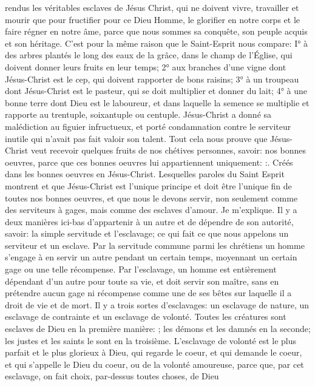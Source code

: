 rendus les véritables esclaves de Jésus Christ, qui ne doivent vivre, travailler et mourir que pour fructifier pour ce
Dieu Homme, le glorifier en notre corps et le faire régner en notre âme, parce que nous sommes sa conquête, son
peuple acquis et son héritage. C'est pour la même raison que le Saint-Esprit nous compare: I° à des arbres plantés
le long des eaux de la grâce, dans le champ de l'Église, qui doivent donner leurs fruits en leur temps; 2° aux
branches d'une vigne dont Jésus-Christ est le cep, qui doivent rapporter de bons raisins; 3° à un troupeau dont
Jésus-Christ est le pasteur, qui se doit multiplier et donner du lait; 4° à une bonne terre dont Dieu est le laboureur,
et dans laquelle la semence se multiplie et rapporte au trentuple, soixantuple ou centuple. Jésus-Christ a donné sa
malédiction au figuier infructueux, et porté condamnation contre le serviteur inutile qui n'avait pas fait valoir son
talent. Tout cela nous prouve que Jésus-Christ veut recevoir quelques fruits de nos chétives personnes, savoir:
nos bonnes oeuvres, parce que ces bonnes oeuvres lui appartiennent uniquement: :. Créés dans les bonnes oeuvres en Jésus-Christ. Lesquelles paroles du Saint Esprit montrent et que
Jésus-Christ est l'unique principe et doit être l'unique fin de toutes nos bonnes oeuvres, et que nous le devons
servir, non seulement comme des serviteurs à gages, mais comme des esclaves d'amour. Je m'explique.
 Il y a deux manières ici-bas d'appartenir à un autre et de dépendre de son autorité, savoir: la simple servitude
et l'esclavage; ce qui fait ce que nous appelons un serviteur et un esclave.
Par la servitude commune parmi les chrétiens un homme s'engage à en servir un autre pendant un certain temps,
moyennant un certain gage ou une telle récompense.
Par l'esclavage, un homme est entièrement dépendant d'un autre pour toute sa vie, et doit servir son maître, sans
en prétendre aucun gage ni récompense comme une de ses bêtes sur laquelle il a droit de vie et de mort.
 Il y a trois sortes d'esclavages: un esclavage de nature, un esclavage de contrainte et un esclavage de
volonté. Toutes les créatures sont esclaves de Dieu en la première manière: ; les
démons et les damnés en la seconde; les justes et les saints le sont en la troisième. L'esclavage de volonté est le
plus parfait et le plus glorieux à Dieu, qui regarde le coeur, et qui demande le coeur, et qui s'appelle le Dieu du
coeur, ou de la volonté amoureuse, parce que, par cet esclavage, on fait choix, par-dessus toutes choses, de Dieu
